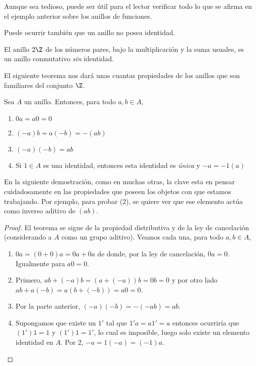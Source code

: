 \begin{nota}
	Aunque sea tedioso, puede ser útil para el lector verificar todo lo que se afirma en el ejemplo anterior sobre los anillos de funciones.
\end{nota}
Puede ocurrir también que un anillo no posea identidad.
\begin{ejem}
	El anillo $2\Z$ de los números pares, bajo la multiplicación y la suma usuales, es un anillo conmutativo \textit{sin} identidad.
\end{ejem}
%
El siguiente teorema nos dará unas cuantas propiedades de los anillos que son familiares del conjunto $\Z$. 

\begin{teo} 
	Sea $A$ un anillo. Entonces, para todo $a,b \in A$, 
	\begin{enumerate}
		\item $0a=a0=0$ 
		\item $(-a)b=a(-b)=-(ab)$ 
		\item $(-a)(-b)=ab$ 
		\item Si $1\in A$ es una identidad, entonces esta identidad es \textit{única} y $-a=-1(a)$
	\end{enumerate} 
\end{teo}
\begin{nota}
	En la siguiente demostración, como en muchas otras, la clave esta en pensar cuidadosamente en las propiedades que poseen los objetos con que estamos trabajando. Por ejemplo, para probar (2), se quiere ver que ese elemento actúa como inverso aditivo de $(ab)$.
\end{nota}
\begin{proof}
	El teorema se sigue de la propiedad distributiva y de la ley de cancelación (considerando a $A$ como un grupo aditivo). Veamos cada una, para todo $a,b\in A$, 
	\begin{enumerate}
		\item $0a = (0+0)a = 0a + 0a$ de donde, por la ley de cancelación, $0a=0$. Igualmente para $a0=0$.
		\item Primero, $ab + (-a)b = (a+(-a))b = 0b = 0$ y por otro lado $ab + a(-b) = a(b+(-b)) = a0 = 0$. 
		\item Por la parte anterior, $(-a)(-b) = -(-ab) = ab$.
		\item Supongamos que existe un $1'$ tal que $1'a = a1' = a$ entonces ocurriría que $(1')1 = 1$ y $(1')1 = 1'$, lo cual es imposible, luego solo existe un elemento identidad en $A$. Por 2, $-a = 1(-a) = (-1)a$.
	\end{enumerate}
\end{proof}
%

